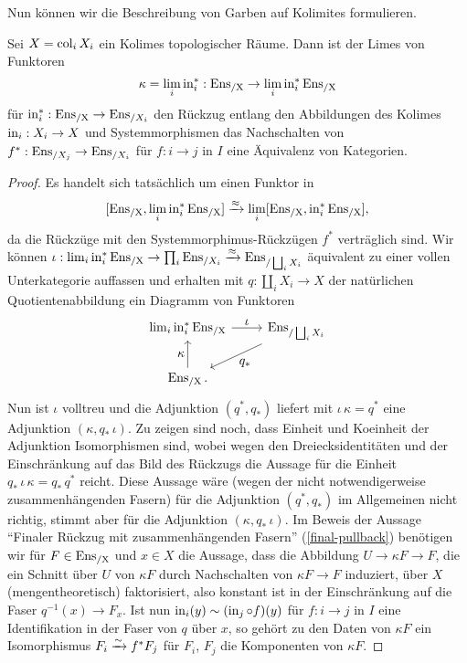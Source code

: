 Nun können wir die Beschreibung von Garben auf Kolimites formulieren.
\begin{satz} \label{sheaf-col}
  Sei $X = \operatorname{col}_i X_i$ ein Kolimes topologischer Räume. Dann ist der
  Limes von Funktoren
  \[ \kappa = \lim_i \operatorname{in}_i^*: \operatorname{Ens_{/X}} \to \lim_i \operatorname{in}_i^* \operatorname{Ens_{/X}} \]
  für $\operatorname{in}_i^*: \operatorname{Ens_{/X}} \to \operatorname{Ens}_{/X_i}$ den Rückzug entlang den
  Abbildungen des Kolimes $\operatorname{in}_i: X_i \to X$ und Systemmorphismen das
  Nachschalten von $f^*: \operatorname{Ens}_{/X_j} \to \operatorname{Ens}_{/X_i}$ für $f: i \to j$
  in $I$ eine Äquivalenz von Kategorien.
\end{satz}
\begin{proof}
  Es handelt sich tatsächlich um einen Funktor in
  \[ [\operatorname{Ens_{/X}}, \lim_i \operatorname{in}_i^* \operatorname{Ens_{/X}}] \xrightarrow{\approx} \lim_i [\operatorname{Ens_{/X}}, \operatorname{in}_i^* \operatorname{Ens_{/X}}], \]
  da die Rückzüge mit den Systemmorphimus-Rückzügen $f^*$ verträglich
  sind. Wir können $\iota: \lim_i \operatorname{in}_i^* \operatorname{Ens_{/X}} \to \prod_i
  \operatorname{Ens}_{/X_i} \xrightarrow{\approx} \operatorname{Ens}_{/\bigsqcup_i X_i}$ äquivalent zu einer vollen
  Unterkategorie auffassen und erhalten mit $q: \coprod_i X_i \to X$
  der natürlichen Quotientenabbildung ein Diagramm von Funktoren
  \[ 
  \begin{tikzcd}
    \lim_i \ins_i^* \EnsX \rar{\textstyle\iota}
    & \Ens_{/\coprod_i X_i} \arrow{dl}{\textstyle q_*} \\
    \EnsX \uar{\textstyle\kappa}. &
  \end{tikzcd}
  \]
  Nun ist $\iota$ volltreu und die Adjunktion $(q^*, q_*)$ liefert mit
  $\iota\,\kappa = q^*$ eine Adjunktion $(\kappa, q_* \, \iota)$. Zu
  zeigen sind noch, dass Einheit und Koeinheit der Adjunktion
  Isomorphismen sind, wobei wegen den Dreiecksidentitäten und der
  Einschränkung auf das Bild des Rückzugs die Aussage für die Einheit
  $q_* \, \iota \, \kappa = q_* \, q^*$ reicht. Diese Aussage wäre
  (wegen der nicht notwendigerweise zusammenhängenden Fasern) für die
  Adjunktion $(q^*, q_*)$ im Allgemeinen nicht richtig, stimmt aber
  für die Adjunktion $(\kappa, q_* \, \iota)$. Im Beweis der Aussage
  ``Finaler Rückzug mit zusammenhängenden Fasern''
  (\ref{final-pullback}) benötigen wir für $F \in \operatorname{Ens_{/X}}$ und $x \in X$
  die Aussage, dass die Abbildung $U \to \kappa F \to F$, die ein
  Schnitt über $U$ von $\kappa F$ durch Nachschalten von $\kappa F \to
  F$ induziert, über $X$ (mengentheoretisch) faktorisiert, also
  konstant ist in der Einschränkung auf die Faser $q^{-1}(x) \to F_x$.
  Ist nun $\operatorname{in}_i(y) \sim (\operatorname{in}_j \circ f)(y)$ für $f: i \to j$ in $I$
  eine Identifikation in der Faser von $q$ über $x$, so gehört zu den
  Daten von $\kappa F$ ein Isomorphismus $F_i \xrightarrow[]{\sim} f^* F_j$ für $F_i$,
  $F_j$ die Komponenten von $\kappa F$.


\end{proof}
